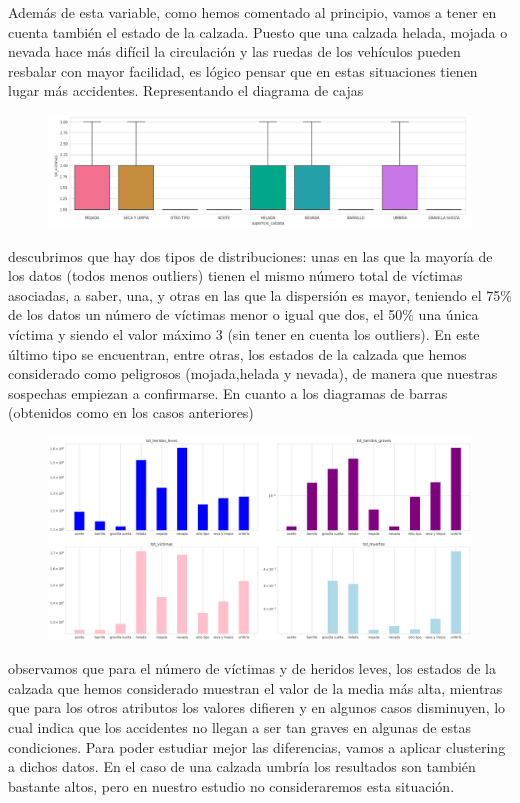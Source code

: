 \documentclass[a4paper,11pt]{book}
\begin{document}
Además de esta variable, como hemos comentado al principio, vamos a tener en cuenta también el estado de la calzada. Puesto que una calzada helada, mojada o nevada hace más difícil la circulación y las ruedas de los vehículos pueden resbalar con mayor facilidad, es lógico pensar que en estas situaciones tienen lugar más accidentes. Representando el diagrama de cajas 

\begin{figure}[H]
	\centering
	\includegraphics[width=1.1\linewidth]{img/cajas-superficie}
	\caption{}
	\label{fig:cajas-superficie}
\end{figure}

descubrimos que hay dos tipos de distribuciones: unas en las que la mayoría de los datos (todos menos outliers) tienen el mismo número total de víctimas asociadas, a saber, una, y otras en las que la dispersión es mayor, teniendo el 75\% de los datos un número de víctimas menor o igual que dos, el 50\% una única víctima y siendo el valor máximo 3 (sin tener en cuenta los outliers). En este último tipo se encuentran, entre otras, los estados de la calzada que hemos considerado como peligrosos (mojada,helada y nevada), de manera que nuestras sospechas empiezan a confirmarse. En cuanto a los diagramas de barras (obtenidos como en los casos anteriores)
\begin{figure}[H]
	\centering
	\includegraphics[width=1.1\linewidth]{img/influencia_calzada}
	\caption{}
	\label{fig:influenciacalzada}
\end{figure}
observamos que para el número de víctimas y de heridos leves, los estados de la calzada que hemos considerado muestran el valor de la media más alta, mientras que para los otros atributos los valores difieren y en algunos casos disminuyen, lo cual indica que los accidentes no llegan a ser tan graves en algunas de estas condiciones. Para poder estudiar mejor las diferencias, vamos a aplicar clustering a dichos datos. En el caso de una calzada umbría los resultados son también bastante altos, pero en nuestro estudio no consideraremos esta situación.
\end{document}
